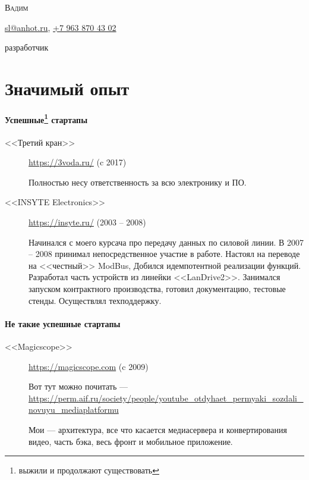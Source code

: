 \documentclass [a4paper,10pt]{article}
\begin{document}
\begin{center}
{\scshape\LARGE Вадим \par}
\Letter\hspace{6pt}\href{mailto:sl@anhot.ru}{sl@anhot.ru},
\Mobilefone\hspace{6pt}\href{tel:+79638704302}{+7 963 870 43 02}

разработчик
\end{center}
\section*{Значимый опыт}
\paragraph{Успешные\protect\footnote{выжили и продолжают существовать} стартапы}
\begin{description}
\item[<<Третий кран>>] \url{https://3voda.ru/} (c 2017) 

Полностью несу ответственность за всю электронику и ПО.

\item[<<INSYTE Electronics>>] \url{https://insyte.ru/} (2003 -- 2008)

Начинался с моего курсача про передачу данных по силовой линии. В 2007 -- 2008 принимал непосредственное участие в работе.
Настоял на переводе на <<честный>> ModBus, Добился идемпотентной реализации функций. Разработал часть устройств из линейки <<LanDrive2>>.
Занимался запуском контрактного производства, готовил документацию, тестовые стенды. Осуществлял техподдержку.
\end{description}

\paragraph{Не такие успешные стартапы}
\begin{description}
\item[<<Magicscope>>] \url{https://magicscope.com} (c 2009)

Вот тут можно почитать --- \url{https://perm.aif.ru/society/people/youtube_otdyhaet_permyaki_sozdali_novuyu_mediaplatformu}
	
Мои --- архитектура, все что касается медиасервера и конвертирования видео, часть бэка, весь фронт и мобильное приложение.
\end{description}
\end{document}
